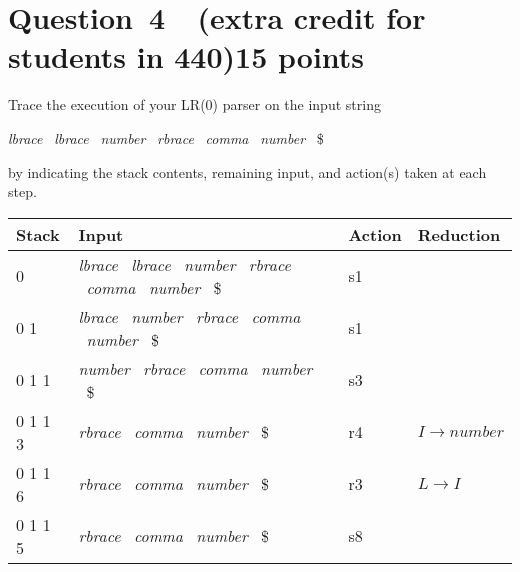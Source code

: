 \documentclass[10pt]{article}
\begin{document}
\section*{Question~4~~(extra credit for students in 440)\hfill 15 points}

Trace the execution of your LR(0) parser on the input string
\begin{center}
\emph{lbrace}  ~\emph{lbrace}  ~\emph{number}  ~\emph{rbrace}
 ~\emph{comma}  ~\emph{number} ~\$
\end{center}
by indicating the stack contents, remaining input, and
action(s) taken at each step.
\begin{framed}
  \begin{tabular}{l|l|l|l}
    Stack                             & Input                                                         & Action & Reduction                                              \\
    \midrule
    0                                 & \emph{lbrace}  ~\emph{lbrace}  ~\emph{number}  ~\emph{rbrace}
    ~\emph{comma}  ~\emph{number} ~\$ & s1                                                            &                                                                 \\
    0 1                               & \emph{lbrace}  ~\emph{number}  ~\emph{rbrace}
    ~\emph{comma}  ~\emph{number} ~\$ & s1                                                            &                                                                 \\
    0 1 1                             & \emph{number}  ~\emph{rbrace}
    ~\emph{comma}  ~\emph{number} ~\$ & s3                                                            &                                                                 \\
    0 1 1 3                           & \emph{rbrace} ~\emph{comma}  ~\emph{number} ~\$               & r4     & $I \rightarrow \mathit{number}$                        \\
    0 1 1 6                           & \emph{rbrace} ~\emph{comma}  ~\emph{number} ~\$               & r3     & $L \rightarrow I$                                      \\
    0 1 1 5                           & \emph{rbrace} ~\emph{comma}  ~\emph{number} ~\$               & s8     &                                                        \\

\end{tabular}
\end{framed}
\end{document}
